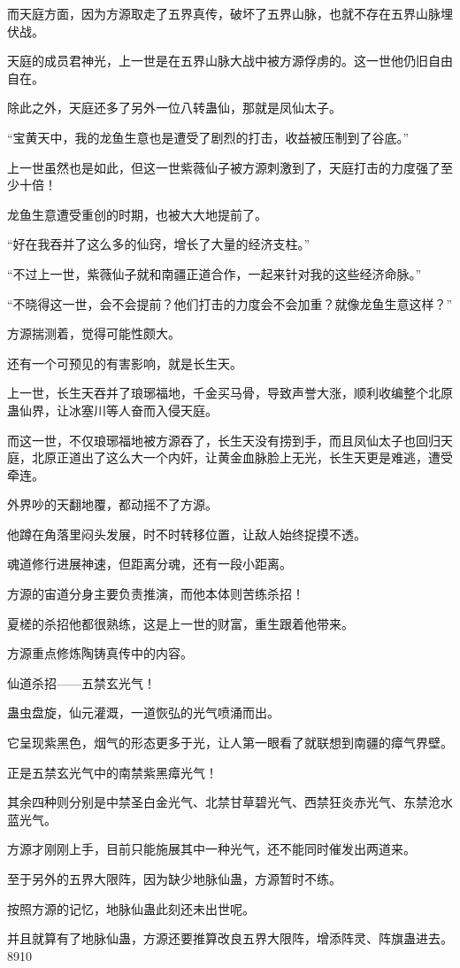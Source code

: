 \begin{this_body}
而天庭方面，因为方源取走了五界真传，破坏了五界山脉，也就不存在五界山脉埋伏战。

天庭的成员君神光，上一世是在五界山脉大战中被方源俘虏的。这一世他仍旧自由自在。

除此之外，天庭还多了另外一位八转蛊仙，那就是凤仙太子。

“宝黄天中，我的龙鱼生意也是遭受了剧烈的打击，收益被压制到了谷底。”

上一世虽然也是如此，但这一世紫薇仙子被方源刺激到了，天庭打击的力度强了至少十倍！

龙鱼生意遭受重创的时期，也被大大地提前了。

“好在我吞并了这么多的仙窍，增长了大量的经济支柱。”

“不过上一世，紫薇仙子就和南疆正道合作，一起来针对我的这些经济命脉。”

“不晓得这一世，会不会提前？他们打击的力度会不会加重？就像龙鱼生意这样？”

方源揣测着，觉得可能性颇大。

还有一个可预见的有害影响，就是长生天。

上一世，长生天吞并了琅琊福地，千金买马骨，导致声誉大涨，顺利收编整个北原蛊仙界，让冰塞川等人奋而入侵天庭。

而这一世，不仅琅琊福地被方源吞了，长生天没有捞到手，而且凤仙太子也回归天庭，北原正道出了这么大一个内奸，让黄金血脉脸上无光，长生天更是难逃，遭受牵连。

外界吵的天翻地覆，都动摇不了方源。

他蹲在角落里闷头发展，时不时转移位置，让敌人始终捉摸不透。

魂道修行进展神速，但距离分魂，还有一段小距离。

方源的宙道分身主要负责推演，而他本体则苦练杀招！

夏槎的杀招他都很熟练，这是上一世的财富，重生跟着他带来。

方源重点修炼陶铸真传中的内容。

仙道杀招——五禁玄光气！

蛊虫盘旋，仙元灌溉，一道恢弘的光气喷涌而出。

它呈现紫黑色，烟气的形态更多于光，让人第一眼看了就联想到南疆的瘴气界壁。

正是五禁玄光气中的南禁紫黑瘴光气！

其余四种则分别是中禁圣白金光气、北禁甘草碧光气、西禁狂炎赤光气、东禁沧水蓝光气。

方源才刚刚上手，目前只能施展其中一种光气，还不能同时催发出两道来。

至于另外的五界大限阵，因为缺少地脉仙蛊，方源暂时不练。

按照方源的记忆，地脉仙蛊此刻还未出世呢。

并且就算有了地脉仙蛊，方源还要推算改良五界大限阵，增添阵灵、阵旗蛊进去。8910

\end{this_body}

